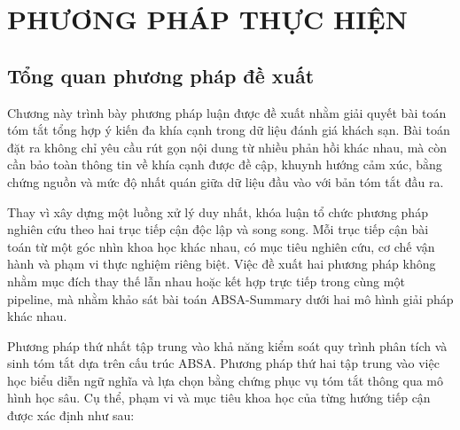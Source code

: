 \chapter{PHƯƠNG PHÁP THỰC HIỆN}

\section{Tổng quan phương pháp đề xuất}

Chương này trình bày phương pháp luận được đề xuất nhằm giải quyết bài toán tóm tắt tổng hợp ý kiến đa khía cạnh trong dữ liệu đánh giá khách sạn. Bài toán đặt ra không chỉ yêu cầu rút gọn nội dung từ nhiều phản hồi khác nhau, mà còn cần bảo toàn thông tin về khía cạnh được đề cập, khuynh hướng cảm xúc, bằng chứng nguồn và mức độ nhất quán giữa dữ liệu đầu vào với bản tóm tắt đầu ra.

Thay vì xây dựng một luồng xử lý duy nhất, khóa luận tổ chức phương pháp nghiên cứu theo hai trục tiếp cận độc lập và song song. Mỗi trục tiếp cận bài toán từ một góc nhìn khoa học khác nhau, có mục tiêu nghiên cứu, cơ chế vận hành và phạm vi thực nghiệm riêng biệt. Việc đề xuất hai phương pháp không nhằm mục đích thay thế lẫn nhau hoặc kết hợp trực tiếp trong cùng một pipeline, mà nhằm khảo sát bài toán ABSA-Summary dưới hai mô hình giải pháp khác nhau.

Phương pháp thứ nhất tập trung vào khả năng kiểm soát quy trình phân tích và sinh tóm tắt dựa trên cấu trúc ABSA. Phương pháp thứ hai tập trung vào việc học biểu diễn ngữ nghĩa và lựa chọn bằng chứng phục vụ tóm tắt thông qua mô hình học sâu. Cụ thể, phạm vi và mục tiêu khoa học của từng hướng tiếp cận được xác định như sau:

